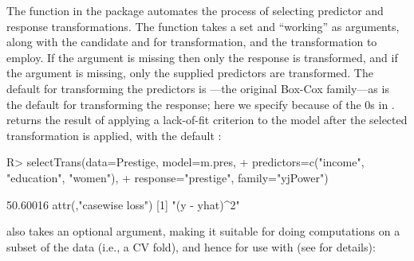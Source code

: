 \documentclass[
]{jss}
\begin{document}
The  function in the  package automates the
process of selecting predictor and response transformations. The
function takes a  set and ``working''  as
arguments, along with the candidate  and
 for transformation, and the transformation 
to employ. If the  argument is missing then only the
response is transformed, and if the  argument is missing,
only the supplied predictors are transformed. The default 
for transforming the predictors is ---the original
Box-Cox family---as is the default  for transforming the
response; here we specify  because of the 0s in
.  returns the result of applying a
lack-of-fit criterion to the model after the selected transformation is
applied, with the default :

\begin{CodeChunk}
\begin{CodeInput}
R> selectTrans(data=Prestige, model=m.pres,
+             predictors=c("income", "education", "women"),
+             response="prestige", family="yjPower")
\end{CodeInput}
\begin{CodeOutput}
[1] 50.60016
attr(,"casewise loss")
[1] "(y - yhat)^2"
\end{CodeOutput}
\end{CodeChunk}

 also takes an optional  argument,
making it suitable for doing computations on a subset of the data (i.e.,
a CV fold), and hence for use with  (see
 for details):
\end{document}
